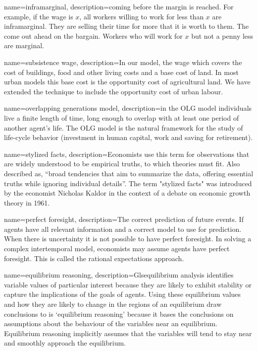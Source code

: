 {
name=inframarginal,
description={coming before the margin is reached. For example, if the wage is $x$, all workers willing to work for less than $x$ are inframarginal. They are selling their time for more that it is worth to them. The come out ahead on the bargain. Workers who will work for $x$ but not a penny less are marginal. }
}

{
name=subsistence wage,
description={In our model, the wage which covers the cost of buildings, food and other living costs and a base cost of land. In most urban models this base cost is  the opportunity cost of agricultural land. We have extended the technique to include the opportunity cost of urban labour. }
}

{
name=overlapping generations model,
description={in the OLG model individuals live a finite length of time, long enough to overlap with at least one period of another agent's life. The OLG model is the natural framework for the study of life-cycle behavior (investment in human capital, work and saving for retirement).}
}

{
name=stylized facts,
description={Economists use this term for observations that are widely understood to be empirical truths, to which theories must fit.  Also described as, ``broad tendencies that aim to summarize the data, offering essential truths while ignoring individual details''. The term "stylized facts" was introduced by the economist Nicholas Kaldor in the context of a debate on economic growth theory in 1961.\cite{kaldorCapitalAccumulationEconomic1961}}
}

{
name=perfect foresight,
description={The correct prediction of future events. If agents have  all relevant information and  a correct model to use for prediction. When there is uncertainty it is not possible to have perfect foresight. In solving a complex intertemporal model, economists may assume agents have perfect foresight. This is called the rational expectations approach. }
}

{
name=equilibrium reasoning,
description={Gls{equilibrium} analysis identifies variable values of particular interest because they are likely to exhibit stability or capture the implications of the goals of agents. Using these equilibrium values and how they are likely to change in the regions of an equilibrium draw conclusions to is `equilibrium reasoning' because it bases the conclusions on assumptions about the behaviour of the variables near an equilibrium. Equilibrium reasoning implicitly  assumes that the variables will tend to stay near and smoothly approach the equilibrium.}
}

